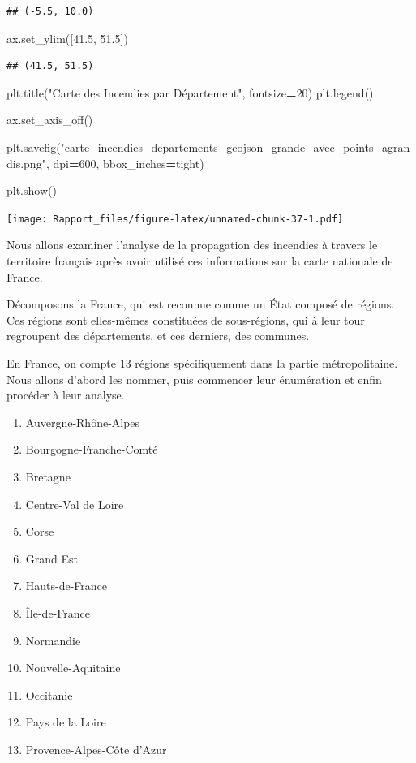 \documentclass[
]{article}
\newenvironment{Shaded}{\begin{snugshade}}{\end{snugshade}}
\newcommand{\DecValTok}[1]{\textcolor[rgb]{0.00,0.00,0.81}{#1}}
\newcommand{\FloatTok}[1]{\textcolor[rgb]{0.00,0.00,0.81}{#1}}
\newcommand{\NormalTok}[1]{#1}
\newcommand{\OperatorTok}[1]{\textcolor[rgb]{0.81,0.36,0.00}{\textbf{#1}}}
\newcommand{\StringTok}[1]{\textcolor[rgb]{0.31,0.60,0.02}{#1}}
\providecommand{\tightlist}{%
  \setlength{\itemsep}{0pt}\setlength{\parskip}{0pt}}
\begin{document}
\begin{verbatim}
## (-5.5, 10.0)
\end{verbatim}

\begin{Shaded}
\begin{Highlighting}[]
\NormalTok{ax.set\_ylim([}\FloatTok{41.5}\NormalTok{, }\FloatTok{51.5}\NormalTok{])   }
\end{Highlighting}
\end{Shaded}

\begin{verbatim}
## (41.5, 51.5)
\end{verbatim}

\begin{Shaded}
\begin{Highlighting}[]
\NormalTok{plt.title(}\StringTok{"Carte des Incendies par Département"}\NormalTok{, fontsize}\OperatorTok{=}\DecValTok{20}\NormalTok{)}
\NormalTok{plt.legend()}

\NormalTok{ax.set\_axis\_off()}

\NormalTok{plt.savefig(}\StringTok{"carte\_incendies\_departements\_geojson\_grande\_avec\_points\_agrandis.png"}\NormalTok{, dpi}\OperatorTok{=}\DecValTok{600}\NormalTok{, bbox\_inches}\OperatorTok{=}\StringTok{\textquotesingle{}tight\textquotesingle{}}\NormalTok{)}

\NormalTok{plt.show()}
\end{Highlighting}
\end{Shaded}

\texttt{[image: Rapport\_files/figure-latex/unnamed-chunk-37-1.pdf]}

Nous allons examiner l'analyse de la propagation des incendies à travers
le territoire français après avoir utilisé ces informations sur la carte
nationale de France.

Décomposons la France, qui est reconnue comme un État composé de
régions. Ces régions sont elles-mêmes constituées de sous-régions, qui à
leur tour regroupent des départements, et ces derniers, des communes.

En France, on compte 13 régions spécifiquement dans la partie
métropolitaine. Nous allons d'abord les nommer, puis commencer leur
énumération et enfin procéder à leur analyse.

\begin{enumerate}
\def\labelenumi{\arabic{enumi}.}
\tightlist
\item
  Auvergne-Rhône-Alpes
\item
  Bourgogne-Franche-Comté
\item
  Bretagne
\item
  Centre-Val de Loire
\item
  Corse
\item
  Grand Est
\item
  Hauts-de-France
\item
  Île-de-France
\item
  Normandie
\item
  Nouvelle-Aquitaine
\item
  Occitanie
\item
  Pays de la Loire
\item
  Provence-Alpes-Côte d'Azur
\end{enumerate}
\end{document}
